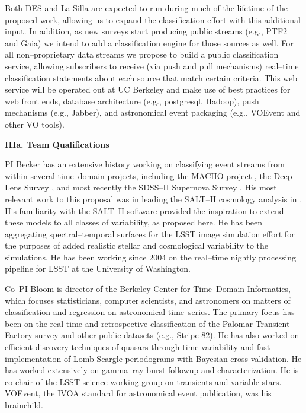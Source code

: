 Both DES and La Silla are expected to run during much of the lifetime of the
proposed work, allowing us to expand the classification effort with this
additional input. In addition, as new surveys start producing public streams
(e.g., PTF2 and Gaia) we intend to add a classification engine for those sources
as well.  For all non--proprietary data streams we propose to build a public
classification service, allowing subscribers to receive (via push and pull
mechanisms) real--time classification statements about each source that match
certain criteria. This web service will be operated out at UC Berkeley and make
use of best practices for web front ends, database architecture (e.g.,
postgresql, Hadoop), push mechanisms (e.g., Jabber), and astronomical event
packaging (e.g., VOEvent and other VO tools).

\bigskip \centerline{\bf IIIa. Team Qualifications} \smallskip

 \smallskip

PI Becker has an extensive history working on classifying event streams from
within several time--domain projects, including the MACHO project
\citep{2000PhDT.......258B}, the Deep Lens Survey \citep{2004ApJ...611..418B},
and most recently the SDSS--II Supernova Survey
\citep{2008AJ....135..338F,2008AJ....135..348S}.  His most relevant work to this
proposal was in leading the SALT--II cosmology analysis in
\cite{2009ApJS..185...32K}.  His familiarity with the SALT--II software provided
the inspiration to extend these models to all classes of variability, as
proposed here. He has been aggregating spectral--temporal surfaces for the LSST
image simulation effort \citep{2010SPIE.7738E..53C} for the purposes of added
realistic stellar and cosmological variability to the simulations.  He has been
working since 2004 on the real--time nightly processing pipeline for LSST at the
University of Washington.

 \smallskip

Co--PI Bloom is director of the Berkeley Center for Time--Domain Informatics,
which focuses statisticians, computer scientists, and astronomers on matters of
classification and regression on astronomical time--series.  The primary focus
has been on the real-time and retrospective classification of the Palomar
Transient Factory survey and other public datasets (e.g., Stripe 82). He has
also worked on efficient discovery techniques of quasars through time
variability and fast implementation of Lomb-Scargle periodograms with Bayesian
cross validation. He has worked extensively on gamma--ray burst followup and
characterization. He is co-chair of the LSST science working group on transients
and variable stars. VOEvent, the IVOA standard for astronomical event
publication, was his brainchild.


